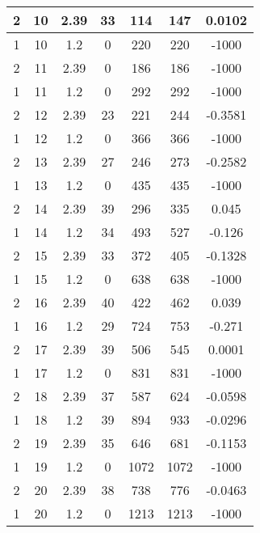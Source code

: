 \documentclass[letterpaper, 12pt]{article}
\begin{document}
\begin{longtable}{|c|c|c|c|c|c|c|}
\hline
2 & 10 & 2.39 & 33 & 114 & 147 & 0.0102 \\
\hline
1 & 10 & 1.2 & 0 & 220 & 220 & -1000 \\
\hline
2 & 11 & 2.39 & 0 & 186 & 186 & -1000 \\
\hline
1 & 11 & 1.2 & 0 & 292 & 292 & -1000 \\
\hline
2 & 12 & 2.39 & 23 & 221 & 244 & -0.3581 \\
\hline
1 & 12 & 1.2 & 0 & 366 & 366 & -1000 \\
\hline
2 & 13 & 2.39 & 27 & 246 & 273 & -0.2582 \\
\hline
1 & 13 & 1.2 & 0 & 435 & 435 & -1000 \\
\hline
2 & 14 & 2.39 & 39 & 296 & 335 & 0.045 \\
\hline
1 & 14 & 1.2 & 34 & 493 & 527 & -0.126 \\
\hline
2 & 15 & 2.39 & 33 & 372 & 405 & -0.1328 \\
\hline
1 & 15 & 1.2 & 0 & 638 & 638 & -1000 \\
\hline
2 & 16 & 2.39 & 40 & 422 & 462 & 0.039 \\
\hline
1 & 16 & 1.2 & 29 & 724 & 753 & -0.271 \\
\hline
2 & 17 & 2.39 & 39 & 506 & 545 & 0.0001 \\
\hline
1 & 17 & 1.2 & 0 & 831 & 831 & -1000 \\
\hline
2 & 18 & 2.39 & 37 & 587 & 624 & -0.0598 \\
\hline
1 & 18 & 1.2 & 39 & 894 & 933 & -0.0296 \\
\hline
2 & 19 & 2.39 & 35 & 646 & 681 & -0.1153 \\
\hline
1 & 19 & 1.2 & 0 & 1072 & 1072 & -1000 \\
\hline
2 & 20 & 2.39 & 38 & 738 & 776 & -0.0463 \\
\hline
1 & 20 & 1.2 & 0 & 1213 & 1213 & -1000 \\
\hline
\end{longtable}
\end{document}
